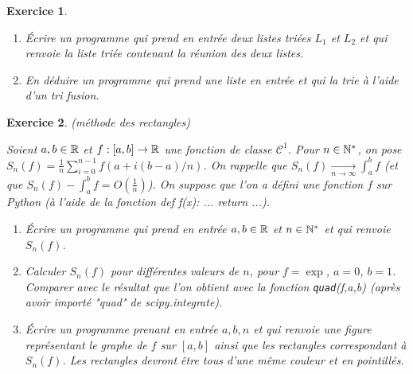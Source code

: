 \documentclass[11pt,a4paper]{article}
\newtheorem{ex}{Exercice}
\begin{document}
\begin{ex}
\begin{enumerate}
\item Écrire un programme qui prend en entrée deux listes triées $L_1$ et $L_2$ et qui renvoie la liste triée contenant la réunion des deux listes.
\item En déduire un programme qui prend une liste en entrée et qui la trie à l'aide d'un tri fusion.
\end{enumerate}
\end{ex}



\begin{ex}(méthode des rectangles)

Soient $a,b\in \mathbb{R}$ et $f:[a,b]\rightarrow \mathbb{R}$ une fonction de classe $\mathcal{C}^1$. Pour $n\in \mathbb{N}^*$, on pose $S_n(f)=\frac{1}{n}\sum_{i=0}^{n-1} f(a+i(b-a)/n)$. On rappelle que $S_n(f)\underset{n\to \infty}{\rightarrow} \int_a^b f$ (et que $S_n(f)-\int_a^b f=O(\frac{1}{n})$).  On suppose que l'on a défini une fonction $f$ sur Python (à l'aide de la fonction def f(x): ... return ...).

\begin{enumerate}
\item Écrire un programme qui prend en entrée  $a,b\in \mathbb{R}$ et $n\in \mathbb{N}^*$ et qui renvoie $S_n(f)$. 

\item Calculer $S_n(f)$ pour différentes valeurs de $n$, pour $f=\exp$, $a=0$, $b=1$. Comparer avec le résultat   que l'on obtient avec la fonction \texttt{quad}(f,a,b) (après avoir importé "quad" de scipy.integrate).

\item Écrire un programme prenant en entrée $a,b,n$ et qui renvoie une figure représentant le graphe de $f$ sur $[a,b]$ ainsi que les rectangles correspondant à $S_n(f)$. Les rectangles devront être tous d'une même couleur et en pointillés.
\end{enumerate}

\end{ex}
\end{document}

